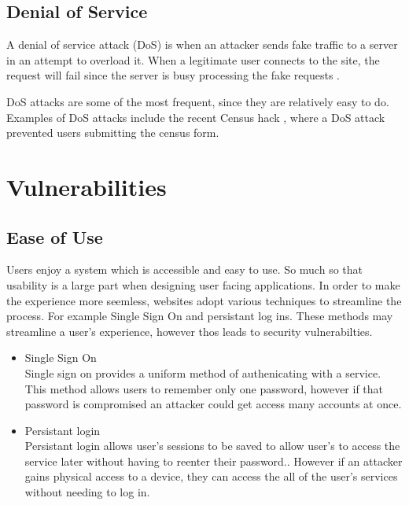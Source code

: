\subsection{Denial of Service}

A denial of service attack (DoS) is when an attacker sends fake traffic to a server in an attempt to overload it. When a legitimate user connects to the site, the request will fail since the server is busy processing the fake requests \cite{department_of_homeland_security_understanding_2009}.

DoS attacks are some of the most frequent, since they are relatively easy to do. Examples of DoS attacks include the recent Census hack \cite{abc_abs_2016}, where a DoS attack prevented users submitting the census form.


\section{Vulnerabilities}

\subsection{Ease of Use}

Users enjoy a system which is accessible and easy to use. So much so that usability is a large part when designing user facing applications. 
In order to make the experience more seemless, websites adopt various techniques to streamline the process. For example Single Sign On and persistant log ins. These methods may streamline a user's experience, however thos leads to security vulnerabilties\cite{javaid_secure_2013}.

\begin{itemize}
    \item Single Sign On\\
        Single sign on provides a uniform method of authenicating with a service. This method allows users to remember only one password, however if that password is compromised an attacker could get access many accounts at once\cite{lu_keeping_2014}.

    \item Persistant login\\
        Persistant login allows user's sessions to be saved to allow user's to access the service later without having to reenter their password.\cite{soares_secure_2013}. However if an attacker gains physical access to a device, they can access the all of the user's services without needing to log in.
\end{itemize}

